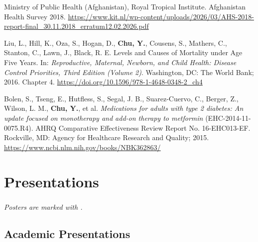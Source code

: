 \documentclass[
  11pt,
  letterpaper,
]{article}
\begin{document}
\begin{etaremune}
\item Ministry of Public Health (Afghanistan), Royal Tropical Institute. Afghanistan Health Survey 2018. \url{https://www.kit.nl/wp-content/uploads/2026/03/AHS-2018-report-final_30.11.2018_erratum12.02.2026.pdf}
\item Liu, L., Hill, K., Oza, S., Hogan, D., \textbf{Chu, Y.}, Cousens, S., Mathers, C., Stanton, C., Lawn, J., Black, R. E. Levels and Causes of Mortality under Age Five Years. In: \emph{Reproductive, Maternal, Newborn, and Child Health: Disease Control Priorities, Third Edition (Volume 2)}. Washington, DC: The World Bank; 2016. Chapter 4. \url{https://doi.org/10.1596/978-1-4648-0348-2_ch4}
\item Bolen, S., Tseng, E., Hutfless, S., Segal, J. B., Suarez-Cuervo, C., Berger, Z., Wilson, L. M., \textbf{Chu, Y.}, et al. \emph{Medications for adults with type 2 diabetes: An update focused on monotherapy and add-on therapy to metformin} (EHC-2014-11-0075.R4). AHRQ Comparative Effectiveness Review Report No. 16-EHC013-EF. Rockville, MD: Agency for Healthcare Research and Quality; 2015. \url{https://www.ncbi.nlm.nih.gov/books/NBK362863/}
\end{etaremune}

\section{Presentations}\label{presentations}

\emph{Posters are marked with \textsuperscript{\dagger}.}

\subsection{Academic Presentations}\label{academic-presentations}
\end{document}
